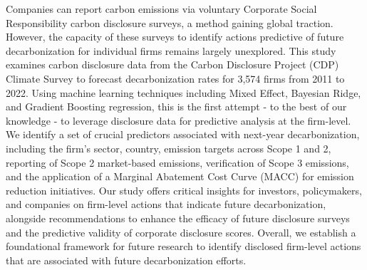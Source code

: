 Companies can report carbon emissions via voluntary Corporate Social Responsibility carbon disclosure surveys, a method gaining global traction. However, the capacity of these surveys to identify actions predictive of future decarbonization for individual firms remains largely unexplored. This study examines carbon disclosure data from the Carbon Disclosure Project (CDP) Climate Survey to forecast decarbonization rates for 3,574 firms from 2011 to 2022. Using machine learning techniques including Mixed Effect, Bayesian Ridge, and Gradient Boosting regression, this is the first attempt - to the best of our knowledge - to leverage disclosure data for predictive analysis at the firm-level. We identify a set of crucial predictors associated with next-year decarbonization, including the firm's sector, country, emission targets across Scope 1 and 2, reporting of Scope 2 market-based emissions, verification of Scope 3 emissions, and the application of a Marginal Abatement Cost Curve (MACC) for emission reduction initiatives. Our study offers critical insights for investors, policymakers, and companies on firm-level actions that indicate future decarbonization, alongside recommendations to enhance the efficacy of future disclosure surveys and the predictive validity of corporate disclosure scores. Overall, we establish a foundational framework for future research to identify disclosed firm-level actions that are associated with future decarbonization efforts.
